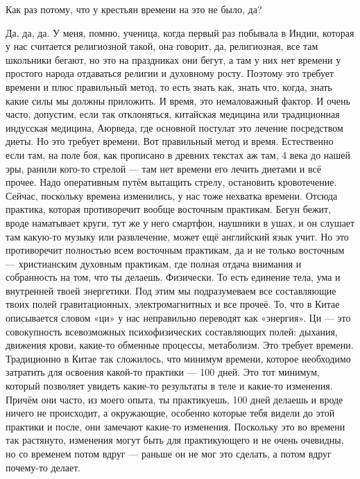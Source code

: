 \A
Как раз потому, что у крестьян времени на это не было, да?

\T
Да, да, да. У меня, помню, ученица, когда первый раз побывала в Индии, которая у нас считается
религиозной такой, она
говорит, да, религиозная, все там школьники бегают, но это на праздниках они бегут, а там у них
нет времени у простого
народа отдаваться религии и духовному росту. Поэтому это требует времени и плюс правильный
метод, то есть знать как,
знать что, когда, знать какие силы мы должны приложить. И время, это немаловажный
фактор.\hfil\break
\indent
И очень часто, допустим, если так отклоняться, китайская медицина или традиционная
индусская медицина, Аюрведа, где основной постулат это
лечение посредством диеты. Но
это требует времени.\hfil\break
\indent
Вот правильный метод и время. Естественно если там, на поле боя, как прописано в древних
текстах аж там, 4 века до
нашей эры, ранили кого-то стрелой --- там нет времени его лечить диетами и всё прочее. Надо
оперативным путём
вытащить стрелу, остановить кровотечение.\hfil\break
\indent
Сейчас,
поскольку времена изменились,
у нас тоже нехватка времени.
Отсюда практика, которая противоречит вообще восточным практикам. Бегун бежит, вроде
наматывает круги, тут же у него смартфон, наушники в ушах, и он слушает там какую-то музыку
или развлечение, может ещё английский язык учит.\hfil\break
\indent
Но это противоречит полностью всем восточным практикам, да и не только восточным --- христианским
духовным практикам, где полная отдача внимания и собранность на том, что ты
делаешь. Физически. То
есть единение тела, ума и внутренней твоей энергетики. Под этим мы подразумеваем
все
составляющие твоих полей
гравитационных, электромагнитных и все прочеё.\hfil\break
\indent
То, что в Китае описывается словом «ци» у нас неправильно
переводят как «энергия». Ци ---
это совокупность всевозможных психофизических составляющих полей: дыхания,
движения крови, какие-то обменные процессы, метаболизм.\hfil\break
\indent
Это требует времени.
Традиционно в Китае так сложилось, что минимум времени, которое необходимо затратить для
освоения какой-то практики --- 100 дней. Это тот минимум, который
позволяет увидеть
какие-то результаты в теле и какие-то изменения.\hfil\break
\indent
Причём они часто, из моего опыта, ты практикуешь, 100 дней делаешь и вроде
ничего не происходит, а окружающие, особенно которые тебя видели до этой практики и после,
они замечают какие-то изменения.
Поскольку это во времени так растянуто, изменения могут быть для практикующего и не
очень очевидны, но со
временем потом вдруг --- раньше он не мог это сделать, а потом вдруг почему-то делает.
